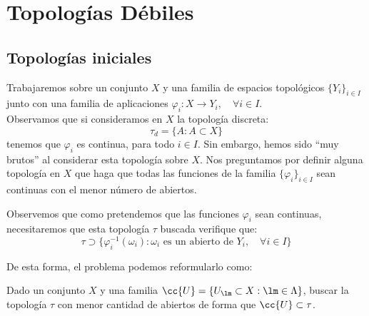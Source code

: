\chapter{Topologías Débiles}
\section{Topologías iniciales}
\noindent
Trabajaremos sobre un conjunto $X$ y una familia de espacios topológicos $\{Y_i\}_{i \in I}$ junto con una familia de aplicaciones $\varphi_i:X\to Y_i, \quad \forall i \in I$.\\

\noindent
Observamos que si consideramos en $X$ la topología discreta:
\begin{equation*}
    \tau_d = \{A : A\subset X\}
\end{equation*}
tenemos que $\varphi_i$ es continua, para todo $i \in I$. Sin embargo, hemos sido ``muy brutos'' al considerar esta topología sobre $X$. Nos preguntamos por definir alguna topología en $X$ que haga que todas las funciones de la familia $\{\varphi_i\}_{i \in I}$ sean continuas con el menor número de abiertos.

\begin{observacion}
    Observemos que como pretendemos que las funciones $\varphi_i$ sean continuas, necesitaremos que esta topología $\tau$ buscada verifique que:
    \begin{equation*}
        \tau \supset \{\varphi_i^{-1}(\omega_i) : \omega_i \text{\ es un abierto de\ } Y_i, \quad \forall i \in I\}
    \end{equation*}
\end{observacion}
\noindent
De esta forma, el problema podemos reformularlo como:

\begin{center}
    Dado un conjunto $X$ y una familia $\cc{U} = \{U_\lm\subset X : \lm \in \Lambda\}$, buscar la topología $\tau$ con menor cantidad de abiertos de forma que $\cc{U}\subset \tau$.
\end{center}

